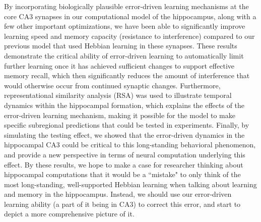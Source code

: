 \documentclass[11pt,twoside]{article}
\newif\myifpdf
\begin{document}
By incorporating biologically plausible error-driven learning mechanisms at the core CA3 synapses in our computational model of the hippocampus, along with a few other important optimizations, we have been able to significantly improve learning speed and memory capacity (resistance to interference) compared to our previous model that used Hebbian learning in these synapses. These results demonstrate the critical ability of error-driven learning to automatically limit further learning once it has achieved sufficient changes to support effective memory recall, which then significantly reduces the amount of interference that would otherwise occur from continued synaptic changes.  Furthermore, representational similarity analysis (RSA) was used to illustrate temporal dynamics within the hippocampal formation, which explains the effects of the error-driven learning mechanism, making it possible for the model to make specific subregional predictions that could be tested in experiments.  Finally, by simulating the testing effect, we showed that the error-driven dynamics in the hippocampal CA3 could be critical to this long-standing behavioral phenomenon, and provide a new perspective in terms of neural computation underlying this effect.  By these results, we hope to make a case for researcher thinking about hippocampal computations that it would be a ``mistake" to only think of the most long-standing, well-supported Hebbian learning when talking about learning and memory in the hippocampus.  Instead, we should use our error-driven learning ability (a part of it being in CA3) to correct this error, and start to depict a more comprehensive picture of it.
\end{document}
